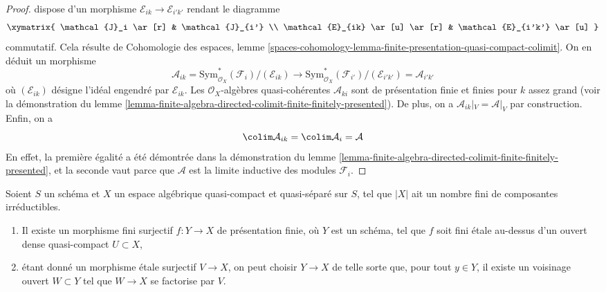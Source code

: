 \begin{proof}
dispose d'un morphisme $\mathcal{E}_{ik} \to \mathcal{E}_{i'k'}$
rendant le diagramme
$$
\xymatrix{
\mathcal{J}_i \ar[r] & \mathcal{J}_{i'} \\
\mathcal{E}_{ik} \ar[u] \ar[r] & \mathcal{E}_{i'k'} \ar[u]
}
$$
commutatif. Cela résulte de Cohomologie des espaces, lemme
\ref{spaces-cohomology-lemma-finite-presentation-quasi-compact-colimit}.
On en déduit un morphisme
$$
\mathcal{A}_{ik} =
\text{Sym}^*_{\mathcal{O}_X}(\mathcal{F}_i)/(\mathcal{E}_{ik})
\longrightarrow
\text{Sym}^*_{\mathcal{O}_X}(\mathcal{F}_{i'})/(\mathcal{E}_{i'k'}) =
\mathcal{A}_{i'k'}
$$
où $(\mathcal{E}_{ik})$ désigne l'idéal engendré par $\mathcal{E}_{ik}$.
Les $\mathcal{O}_X$-algèbres quasi-cohérentes $\mathcal{A}_{ki}$
sont de présentation finie et finies pour $k$ assez grand
(voir la démonstration du
lemme \ref{lemma-finite-algebra-directed-colimit-finite-finitely-presented}).
De plus, on a $\mathcal{A}_{ik}|_V = \mathcal{A}|_V$ par construction.
Enfin, on a
$$
\colim \mathcal{A}_{ik} = \colim \mathcal{A}_i = \mathcal{A}
$$
En effet, la première égalité a été démontrée dans la démonstration du
lemme \ref{lemma-finite-algebra-directed-colimit-finite-finitely-presented},
et la seconde vaut parce que $\mathcal{A}$ est la limite inductive des
modules $\mathcal{F}_i$.
\end{proof}

\begin{lemma}
\label{lemma-there-is-a-scheme-finite-over-refined}
Soient $S$ un schéma et $X$ un espace algébrique quasi-compact et quasi-séparé
sur $S$, tel que $|X|$ ait un nombre fini de composantes
irréductibles.
\begin{enumerate}
\item Il existe un morphisme fini surjectif $f : Y \to X$
de présentation finie, où $Y$ est un schéma, tel que $f$
soit fini étale au-dessus d'un ouvert dense quasi-compact $U \subset X$,
\item étant donné un morphisme étale surjectif $V \to X$, on peut choisir
$Y \to X$ de telle sorte que, pour tout $y \in Y$, il existe un voisinage ouvert
$W \subset Y$ tel que $W \to X$ se factorise par $V$.
\end{enumerate}
\end{lemma}

